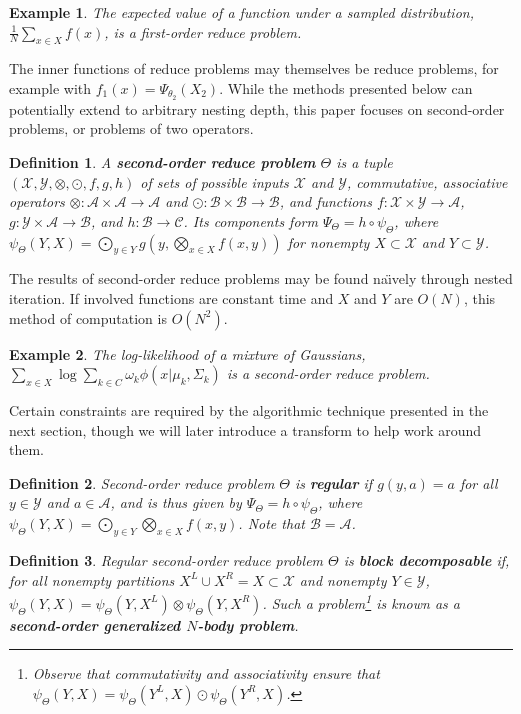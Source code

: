 \documentclass{article}
\newtheorem{definition} {Definition}
\newtheorem{example} {Example}
\newcommand{\killspace}{\vspace{-0.1in}}
\newcommand{\GNP}[1][\psi]{{#1}_{\Theta}}
\newcommand{\comp}{\mathbin{\circ}}
\begin{document}
\begin{example}
  The expected value of a function under a sampled distribution,
  $\frac{1}{N} \sum_{x \in X} f(x)$, is a first-order reduce problem.
\end{example}
\killspace
The inner functions of reduce problems may themselves be reduce
problems, for example with $f_1(x) = \Psi_{\theta_2}(X_2)$.  While the
methods presented below can potentially extend to arbitrary nesting
depth, this paper focuses on second-order problems, or problems of two
operators.
\begin{definition}
  A {\bf second-order reduce problem} $\Theta$ is a tuple
  $(\mathcal{X},\mathcal{Y},\otimes,\odot,f,g,h)$ of sets of possible
  inputs $\mathcal{X}$ and $\mathcal{Y}$, commutative, associative
  operators $\otimes \colon \mathcal{A} \times \mathcal{A} \to
  \mathcal{A}$ and $\odot \colon \mathcal{B} \times \mathcal{B} \to
  \mathcal{B}$, and functions $f \colon \mathcal{X} \times \mathcal{Y}
  \to \mathcal{A}$, $g \colon \mathcal{Y} \times \mathcal{A} \to
  \mathcal{B}$, and $h \colon \mathcal{B} \to \mathcal{C}$.  Its
  components form $\Psi_{\Theta} = h \comp \psi_{\Theta}$, where
  $\psi_{\Theta}(Y,X) = \bigodot_{y \in Y} g \left( y,\bigotimes_{x
  \in X} f(x,y) \right)$ for nonempty $X \subset \mathcal{X}$ and $Y
  \subset \mathcal{Y}$.
\end{definition}
\killspace
\noindent The results of second-order reduce problems may be found
na\"{\i}vely through nested iteration.  If involved functions are
constant time and $X$ and $Y$ are $O(N)$, this method of computation
is $O(N^2)$.
\begin{example}
  The log-likelihood of a mixture of Gaussians, $\sum_{x \in X} \log
  \sum_{k \in C} \omega_k \phi(x | \mu_k, \Sigma_k)$ is a second-order
  reduce problem.
\end{example}
\killspace
Certain constraints are required by the algorithmic technique
presented in the next section, though we will later introduce a
transform to help work around them.
\begin{definition}
  Second-order reduce problem $\Theta$ is {\bf regular} if $g(y,a) =
  a$ for all $y \in \mathcal{Y}$ and $a \in \mathcal{A}$, and is thus
  given by $\Psi_{\Theta} = h \comp \psi_{\Theta}$, where
  $\psi_{\Theta}(Y,X) = \bigodot_{y \in Y} \bigotimes_{x \in X}
  f(x,y)$.  Note that $\mathcal{B} = \mathcal{A}$.
\end{definition}
\begin{definition}
  Regular second-order reduce problem $\Theta$ is {\bf block
  decomposable} if, for all nonempty partitions $X^{\!L} \cup X^{\!R}
  = X \subset \mathcal{X}$ and nonempty $Y \in \mathcal{Y}$,
  $\GNP(Y,X) = \GNP(Y,X^{\!L}) \otimes \GNP(Y,X^{\!R})$.  Such a
  problem\footnote{Observe that commutativity and associativity ensure
  that $\GNP(Y,X) = \GNP(Y^{\!L},X) \odot \GNP(Y^{\!R},X)$.} is known
  as a {\bf second-order generalized $N$-body problem}.
\end{definition}
\end{document}
